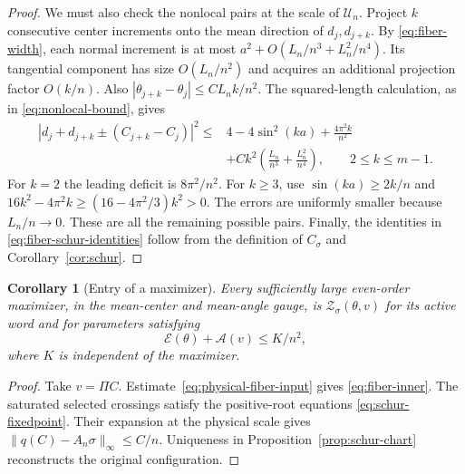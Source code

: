 \documentclass[11pt,reqno]{amsart}
\numberwithin{equation}{section}
\newtheorem{corollary}[theorem]{Corollary}
\theoremstyle{definition}
\theoremstyle{remark}
\newcommand{\A}{\mathcal A}
\newcommand{\E}{\mathcal E}
\newcommand{\norm}[1]{\lVert #1\rVert}
\newcommand{\UU}{\mathscr U_n}
\begin{document}
\begin{proof}
We must also check the nonlocal pairs at the scale of $\UU$. Project $k$ consecutive center increments onto the mean direction of $d_j,d_{j+k}$. By \eqref{eq:fiber-width}, each normal increment is at most
$a^2+O(L_n/n^3+L_n^2/n^4)$. Its tangential component has size $O(L_n/n^2)$ and acquires an additional projection factor $O(k/n)$. Also
$|\theta_{j+k}-\theta_j|\le CL_nk/n^2$. The squared-length calculation, as in \eqref{eq:nonlocal-bound}, gives
\begin{equation}\label{eq:fiber-nonlocal}
 \begin{split}
 |d_j+d_{j+k}\pm(C_{j+k}-C_j)|^2
 \le{}&4-4\sin^2(ka)+\frac{4\pi^2k}{n^2}\\
 &+Ck^2\left(\frac{L_n}{n^3}+\frac{L_n^2}{n^4}\right),
 \qquad 2\le k\le m-1.
 \end{split}
\end{equation}
For $k=2$ the leading deficit is $8\pi^2/n^2$. For $k\ge3$, use
$\sin(ka)\ge2k/n$ and
$16k^2-4\pi^2k\ge(16-4\pi^2/3)k^2>0$.
The errors are uniformly smaller because $L_n/n\to0$. These are all the remaining possible pairs. Finally, the identities in \eqref{eq:fiber-schur-identities} follow from the definition of $C_\sigma$ and Corollary~\ref{cor:schur}.
\end{proof}

\begin{corollary}[Entry of a maximizer]\label{cor:fiber-entry}
Every sufficiently large even-order maximizer, in the mean-center and mean-angle gauge, is $\mathcal Z_\sigma(\theta,v)$ for its active word and for parameters satisfying
\begin{equation}\label{eq:fiber-inner}
 \E(\theta)+\A(v)\le K/n^2,
\end{equation}
where $K$ is independent of the maximizer.
\end{corollary}
\begin{proof}
Take $v=\Pi C$. Estimate~\eqref{eq:physical-fiber-input} gives \eqref{eq:fiber-inner}. The saturated selected crossings satisfy the positive-root equations \eqref{eq:schur-fixedpoint}. Their expansion at the physical scale gives
$\norm{q(C)-A_n\sigma}_\infty\le C/n$. Uniqueness in Proposition~\ref{prop:schur-chart} reconstructs the original configuration.
\end{proof}
\end{document}
